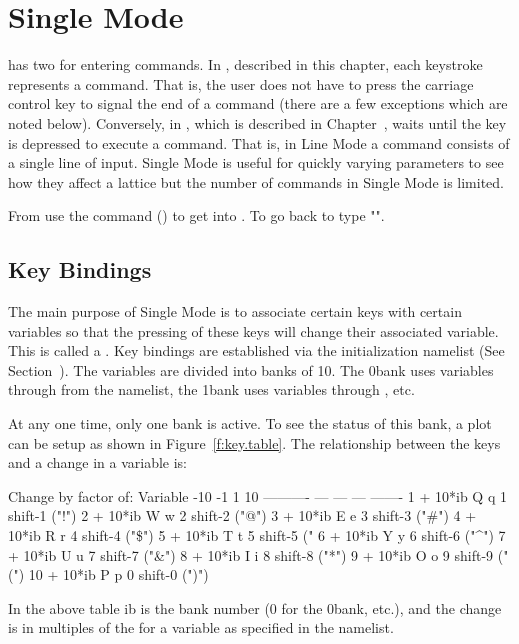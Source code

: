 \chapter{Single Mode}
\label{c:single}

\tao has two  for entering commands. In ,
described in this chapter, each keystroke represents a command.  That
is, the user does not have to press the carriage control key to signal
the end of a command (there are a few exceptions which are noted
below). Conversely, in , which is described in
Chapter~, \tao waits until the  key is
depressed to execute a command. That is, in Line Mode a command
consists of a single line of input.  Single Mode is useful for quickly
varying parameters to see how they affect a lattice but the number of
commands in Single Mode is limited.

From  use the  command ()
to get into . To go back to  type
"".

\section{Key Bindings}
\label{s:key.bind}

The main purpose of Single Mode is to associate certain keys with
certain variables so that the pressing of these keys will change their
associated variable. This is called a .  Key bindings
are established via the  initialization namelist (See
Section~). The variables are divided into banks of
10. The 0\Th bank uses variables  through  from
the  namelist, the 1\St bank uses variables
 through , etc.  

At any one time, only one bank is active. To see the status of this
bank, a  plot can be setup as shown in
Figure~\ref{f:key.table}. The relationship between the keys and a
change in a variable is:
\begin{example}
                 Change by factor of:          
     Variable    -10  -1    1     10
   ----------    ---  ---  ---  -------
    1 + 10*ib     Q    q    1   shift-1   ("!")
    2 + 10*ib     W    w    2   shift-2   ("@")
    3 + 10*ib     E    e    3   shift-3   ("\#")
    4 + 10*ib     R    r    4   shift-4   ("\$")
    5 + 10*ib     T    t    5   shift-5   ("%
    6 + 10*ib     Y    y    6   shift-6   ("^")
    7 + 10*ib     U    u    7   shift-7   ("\&")
    8 + 10*ib     I    i    8   shift-8   ("*")
    9 + 10*ib     O    o    9   shift-9   ("(")
   10 + 10*ib     P    p    0   shift-0   (")")
\end{example}
In the above table ib is the bank number (0 for the 0\Th bank, etc.),
and the change is in multiples of the  for a variable as
specified in the  namelist. 


